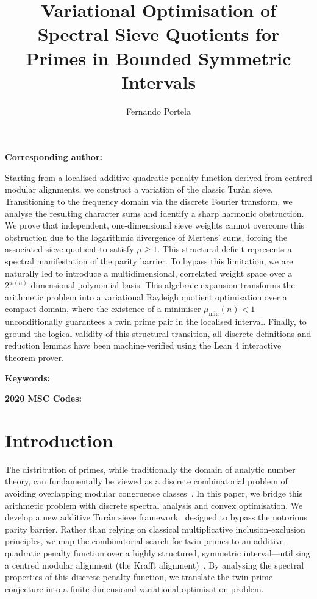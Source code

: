 \documentclass[10pt,twoside]{article}
\title[Variational Optimisation of Sieve Quotients]{Variational Optimisation of Spectral Sieve Quotients for Primes in Bounded Symmetric Intervals}
\author[F. Portela]{Fernando Portela \href{https://orcid.org/0000-0003-0238-9251}{\orcid} }
\affiliation{Ronin Institute for Independent Scholarship 2.0, Sacramento, CA 95816 USA}
\makeatletter
\newcommand{\@shorttitle}{}
\newcommand{\@shortauthor}{}
\newcommand{\@affiliation}{}
\newcommand{\@history}{}
\newcommand{\@keywords}{}
\newcommand{\@msc}{}
\newcommand{\@corresp}{}
\renewenvironment{abstract}{%
  \begin{lrbox}{\@tempboxa}\begin{minipage}{\dimexpr\textwidth-18pt}%
  \vspace{9pt}%
  \noindent\hspace*{9pt}{\fontfamily{phv}\fontsize{9}{10}\fontseries{b}%
    \selectfont Abstract}\par\vspace{4.5pt}%
  \leftskip=9pt\rightskip=9pt
  \fontsize{9}{11}\selectfont
}{%
  \par\vspace{7pt}\end{minipage}\end{lrbox}%
  \noindent\colorbox{cpcshade}{\usebox{\@tempboxa}}\par
}
\renewcommand{\maketitle}{%
  \thispagestyle{plain}%
  \begingroup
  \parindent=0pt\raggedright
  {\fontfamily{phv}\fontsize{16}{18}\fontseries{b}\selectfont\@title\par}%
  \vskip12.3pt
  {\fontsize{10}{12}\selectfont\@author\par}%
  \ifx\@affiliation\@empty\else
    \vskip7pt{\fontsize{8}{10}\selectfont\@affiliation\par}%
  \fi
  \ifx\@corresp\@empty\else
    \vskip3pt{\fontsize{8}{10}\selectfont\textbf{Corresponding author:} \@corresp\par}%
  \fi
  \ifx\@history\@empty\else
    \vskip6.5pt{\fontsize{8}{10}\selectfont\@history\par}%
  \fi
  \vskip9pt
  \endgroup
  \markboth{\@shortauthor}{\@shorttitle}%
}
\newcommand{\printmetadata}{%
  \begingroup\parindent=0pt
  \def\cpckw{\@keywords}%
  \ifx\cpckw\@empty\else
    \vskip12pt
    {\fontsize{8}{10}\selectfont
     \textbf{Keywords:} \@keywords\par}%
  \fi
  \def\cpcmsc{\@msc}%
  \ifx\cpcmsc\@empty\else
    \vskip4pt
    {\fontsize{8}{10}\selectfont
     \textbf{2020 MSC Codes:} \@msc\par}%
  \fi
  \vskip 32pt
  \endgroup
}
\theoremstyle{cpctheorem}
\theoremstyle{cpcremark}
\makeatother
\begin{document}
\maketitle


\begin{abstract}
Starting from a localised additive quadratic penalty function derived from centred modular
alignments, we construct a variation of the classic Turán sieve. Transitioning to the frequency
domain via the discrete Fourier transform, we analyse the resulting character sums and identify a
sharp harmonic obstruction. We prove that independent, one-dimensional sieve weights cannot
overcome this obstruction due to the logarithmic divergence of Mertens' sums, forcing the
associated sieve quotient to satisfy $\mu \ge 1$. This structural deficit represents a spectral
manifestation of the parity barrier. To bypass this limitation, we are naturally led to introduce
a multidimensional, correlated weight space over a $2^{w(n)}$-dimensional polynomial basis. This
algebraic expansion transforms the arithmetic problem into a variational Rayleigh quotient
optimisation over a compact domain, where the existence of a minimiser $\mu_{\min}(n) < 1$
unconditionally guarantees a twin prime pair in the localised interval. Finally, to ground the
logical validity of this structural transition, all discrete definitions and reduction lemmas have
been machine-verified using the Lean 4 interactive theorem prover.
\end{abstract}

\printmetadata

\section{Introduction} \label{introduction}

The distribution of primes, while traditionally the domain of analytic number theory, can
fundamentally be viewed as a discrete combinatorial problem of avoiding overlapping modular
congruence classes~\cite{TaoVu2006}. In this paper, we bridge this arithmetic problem with discrete
spectral analysis and convex optimisation. We develop a new additive Turán sieve
framework~\cite{Turan1934} designed to bypass the notorious parity barrier. Rather than relying on
classical multiplicative inclusion-exclusion principles, we map the combinatorial search for twin
primes to an additive quadratic penalty function over a highly structured, symmetric
interval---utilising a centred modular alignment (the Krafft
alignment)~\cite{Krafft1801,Portela2026}. By analysing the spectral properties of this discrete
penalty function, we translate the twin prime conjecture into a finite-dimensional variational
optimisation problem.
\end{document}
